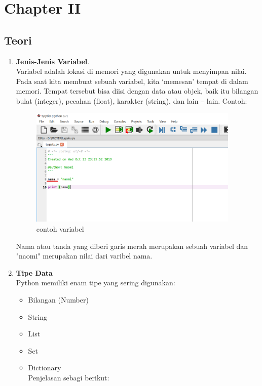 \chapter{Chapter II}
\section{Teori}
\begin{enumerate}
\item \textbf{Jenis-Jenis Variabel}.\\
Variabel adalah lokasi di memori yang digunakan untuk menyimpan nilai. Pada saat kita membuat sebuah variabel, kita ‘memesan’ tempat di dalam memori. Tempat tersebut bisa diisi dengan data atau objek, baik itu bilangan bulat (integer), pecahan (float), karakter (string), dan lain – lain. Contoh:\\
	\begin{figure}[h]
	\centering
	\includegraphics[width=10cm]{gambar2/cth1.png}
	\caption{contoh variabel}
	\end{figure}
	
Nama atau tanda yang diberi garis merah merupakan sebuah variabel dan "naomi" merupakan nilai dari varibel nama.\\

\item \textbf{Tipe Data}\\
    		Python memiliki enam tipe yang sering digunakan: 
\begin{itemize}
\item Bilangan (Number)
\item String
\item List
\item Set
\item Dictionary\\ Penjelasan sebagi berikut:\\


\end{itemize}
\end{enumerate}
